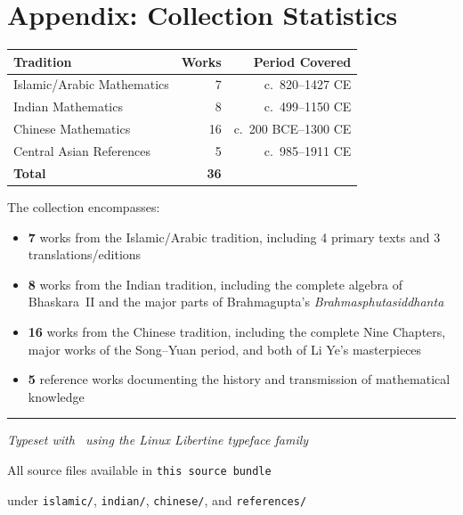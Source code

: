\documentclass[11pt,a4paper]{article}
\begin{document}
\newpage
\section*{Appendix: Collection Statistics}

\begin{center}
\begin{tabular}{lrr}
\toprule
\textbf{Tradition} & \textbf{Works} & \textbf{Period Covered} \\
\midrule
Islamic/Arabic Mathematics & 7 & c.~820--1427 CE \\
Indian Mathematics & 8 & c.~499--1150 CE \\
Chinese Mathematics & 16 & c.~200 BCE--1300 CE \\
Central Asian References & 5 & c.~985--1911 CE \\
\midrule
\textbf{Total} & \textbf{36} & \\
\bottomrule
\end{tabular}
\end{center}

\vspace{1cm}

\noindent The collection encompasses:
\begin{itemize}
  \item \textbf{7} works from the Islamic/Arabic tradition, including 4 primary texts and 3 translations/editions
  \item \textbf{8} works from the Indian tradition, including the complete algebra of Bhaskara~II and the major parts of Brahmagupta's \textit{Brahmasphutasiddhanta}
  \item \textbf{16} works from the Chinese tradition, including the complete Nine Chapters, major works of the Song--Yuan period, and both of Li Ye's masterpieces
  \item \textbf{5} reference works documenting the history and transmission of mathematical knowledge
\end{itemize}

\vspace{1cm}

\begin{center}
{\color{goldaccent}\rule{0.4\textwidth}{0.8pt}}

\vspace{0.5cm}

\textit{\color{sectioncolor}Typeset with \XeLaTeX\ using the Linux Libertine typeface family}

\vspace{0.3cm}

{\color{sectioncolor}All source files available in \texttt{this source bundle}}

{\color{sectioncolor}under \texttt{islamic/}, \texttt{indian/}, \texttt{chinese/}, and \texttt{references/}}
\end{center}
\end{document}
